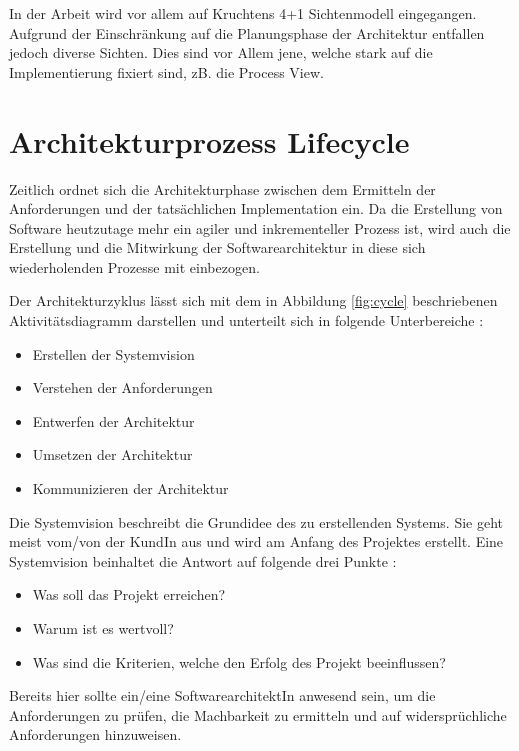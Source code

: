 In der Arbeit wird vor allem auf Kruchtens 4+1 Sichtenmodell eingegangen. Aufgrund der Einschränkung auf die Planungsphase der Architektur entfallen jedoch diverse Sichten. Dies sind vor Allem jene, welche stark auf die Implementierung fixiert sind, zB. die Process View.

\section{Architekturprozess Lifecycle}
Zeitlich ordnet sich die Architekturphase zwischen dem Ermitteln der Anforderungen und der tatsächlichen Implementation ein. Da die Erstellung von Software heutzutage mehr ein agiler und inkrementeller Prozess ist, wird auch die Erstellung und die Mitwirkung der Softwarearchitektur in diese sich wiederholenden Prozesse mit einbezogen. \cite[S. 7]{basiswissen}

Der Architekturzyklus lässt sich mit dem in Abbildung \ref{fig:cycle} beschriebenen Aktivitätsdiagramm darstellen und unterteilt sich in folgende Unterbereiche \cite[Umschlag]{softarch}:

\begin{itemize}
  \item \glqq Erstellen der Systemvision\grqq
  \item \glqq Verstehen der Anforderungen\grqq
  \item \glqq Entwerfen der Architektur\grqq
  \item \glqq Umsetzen der Architektur\grqq
  \item \glqq Kommunizieren der Architektur\grqq
\end{itemize}

Die Systemvision beschreibt die Grundidee des zu erstellenden Systems. Sie geht meist vom/von der KundIn aus und wird am Anfang des Projektes erstellt. Eine Systemvision beinhaltet die Antwort auf folgende drei Punkte \cite[S. 202-206]{vision}:

\begin{itemize}
  \item Was soll das Projekt erreichen?
  \item Warum ist es wertvoll?
  \item Was sind die Kriterien, welche den Erfolg des Projekt beeinflussen?
\end{itemize}

Bereits hier sollte ein/eine SoftwarearchitektIn anwesend sein, um die Anforderungen zu prüfen, die Machbarkeit zu ermitteln und auf widersprüchliche Anforderungen hinzuweisen. \cite[S. 352-353]{softarch}

